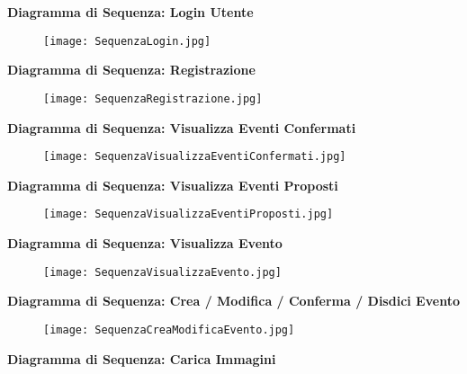 \textbf{Diagramma di Sequenza: Login Utente}

\begin{figure}[h!]
    \begin{center}
        \texttt{[image: SequenzaLogin.jpg]}
    \end{center}
\end{figure}
\hfill \break

\textbf{Diagramma di Sequenza: Registrazione}

\begin{figure}[h!]
    \begin{center}
        \texttt{[image: SequenzaRegistrazione.jpg]}
    \end{center}
\end{figure}
\hfill \break
\newpage

\textbf{Diagramma di Sequenza: Visualizza Eventi Confermati}

\begin{figure}[h!]
    \begin{center}
        \texttt{[image: SequenzaVisualizzaEventiConfermati.jpg]}
    \end{center}
\end{figure}
\hfill \break

\textbf{Diagramma di Sequenza: Visualizza Eventi Proposti}

\begin{figure}[h!]
    \begin{center}
        \texttt{[image: SequenzaVisualizzaEventiProposti.jpg]}
    \end{center}
\end{figure}
\hfill \break
\newpage
\textbf{Diagramma di Sequenza: Visualizza Evento}

\begin{figure}[h!]
    \begin{center}
        \texttt{[image: SequenzaVisualizzaEvento.jpg]}
    \end{center}
\end{figure}
\hfill \break


\textbf{Diagramma di Sequenza: Crea / Modifica / Conferma / Disdici Evento}

\begin{figure}[h!]
    \begin{center}
        \texttt{[image: SequenzaCreaModificaEvento.jpg]}
    \end{center}
\end{figure}
\hfill \break
\clearpage
\textbf{Diagramma di Sequenza: Carica Immagini}

